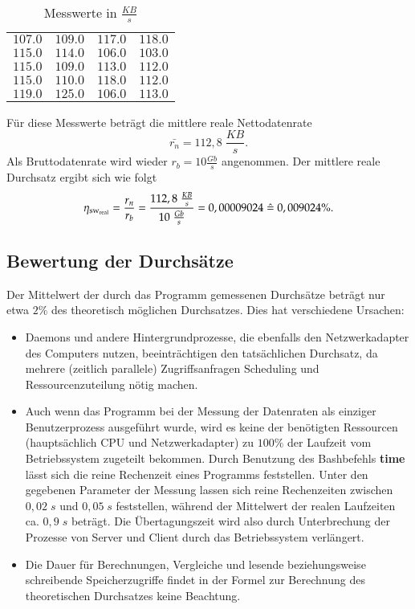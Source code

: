 \documentclass{scrartcl}
\begin{document}
\begin{table}[H]
\centering
\begin{tabular}{||l|l|l|l||}
\hline
$107.0$ & $ 109.0$ & $ 117.0$ & $ 118.0$ \\
$115.0$ & $ 114.0$ & $ 106.0$ & $103.0$ \\
$115.0$ & $ 109.0$ & $ 113.0$ & $112.0$ \\
$115.0$ & $ 110.0$ & $ 118.0$ & $112.0$ \\
$119.0$ & $ 125.0$ & $ 106.0$ & $113.0$ \\
\hline
\end{tabular}
\caption{Messwerte in $\frac{KB}{s}$}
\end{table}

Für diese Messwerte beträgt die mittlere reale Nettodatenrate $$\bar{r_n} = 112,8\;\frac{KB}{s}.$$ 
Als Bruttodatenrate wird wieder $r_b = 10 \frac{Gb}{s}$ angenommen. Der mittlere reale Durchsatz ergibt sich wie folgt $$\eta\textsubscript{sw\textsubscript{real}} = \frac{r_n}{r_b} = \frac{112,8\;\frac{KB}{s}}{10 \; \frac{Gb}{s}} = 0,00009024 \;\hat{=}\; 0,009024\%.$$

\subsection{Bewertung der Durchsätze}
Der Mittelwert der durch das Programm gemessenen Durchsätze beträgt nur etwa $2\%$ des theoretisch möglichen Durchsatzes. Dies hat verschiedene Ursachen:
\begin{itemize}
\item Daemons und andere Hintergrundprozesse, die ebenfalls den Netzwerkadapter des Computers nutzen, beeinträchtigen den tatsächlichen Durchsatz, da mehrere (zeitlich parallele) Zugriffsanfragen Scheduling und Ressourcenzuteilung nötig machen.
\item Auch wenn das Programm bei der Messung der Datenraten als einziger Benutzerprozess ausgeführt wurde, wird es keine der benötigten Ressourcen (hauptsächlich CPU und Netzwerkadapter) zu $100\%$ der Laufzeit vom Betriebssystem zugeteilt bekommen. Durch Benutzung des Bashbefehls \textbf{time} lässt sich die reine Rechenzeit eines Programms feststellen. Unter den gegebenen Parameter der Messung lassen sich reine Rechenzeiten zwischen $0,02\;s$ und $0,05\;s$ feststellen, während der Mittelwert der realen Laufzeiten ca. $0,9\;s$ beträgt. Die Übertagungszeit wird also durch Unterbrechung der Prozesse von Server und Client durch das Betriebssystem verlängert.
\item Die Dauer für Berechnungen, Vergleiche und lesende beziehungsweise schreibende Speicherzugriffe findet in der Formel zur Berechnung des theoretischen Durchsatzes keine Beachtung.
\end{itemize}
\end{document}
